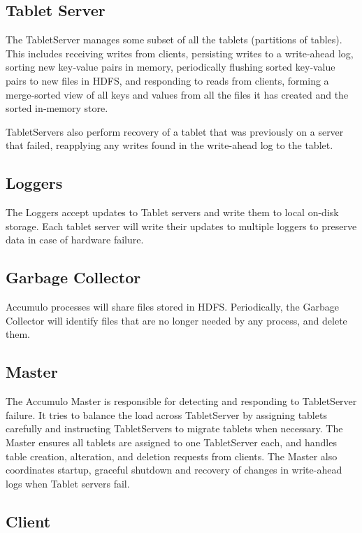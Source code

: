 \subsection{Tablet Server}

The TabletServer manages some subset of all the tablets (partitions of tables). This includes receiving writes from clients, persisting writes to a
write‐ahead log, sorting new key‐value pairs in memory, periodically
flushing sorted key‐value pairs to new files in HDFS, and responding
to reads from clients, forming a merge‐sorted view of all keys and
values from all the files it has created and the sorted in‐memory
store.

TabletServers also perform recovery of a tablet
that was previously on a server that failed, reapplying any writes
found in the write-ahead log to the tablet.

\subsection{Loggers}

The Loggers accept updates to Tablet servers and write them to local
on-disk storage.  Each tablet server will write their updates to
multiple loggers to preserve data in case of hardware failure.

\subsection{Garbage Collector}

Accumulo processes will share files stored in HDFS.  Periodically, the Garbage
Collector will identify files that are no longer needed by any process, and
delete them.

\subsection{Master}

The Accumulo Master is responsible for detecting and responding to TabletServer
failure. It tries to balance the load across TabletServer by assigning tablets carefully
and instructing TabletServers to migrate tablets when necessary. The Master ensures all
tablets are assigned to one TabletServer each, and handles table creation, alteration,
and deletion requests from clients. The Master also coordinates startup, graceful
shutdown and recovery of changes in write-ahead logs when Tablet servers fail.

\subsection{Client}

